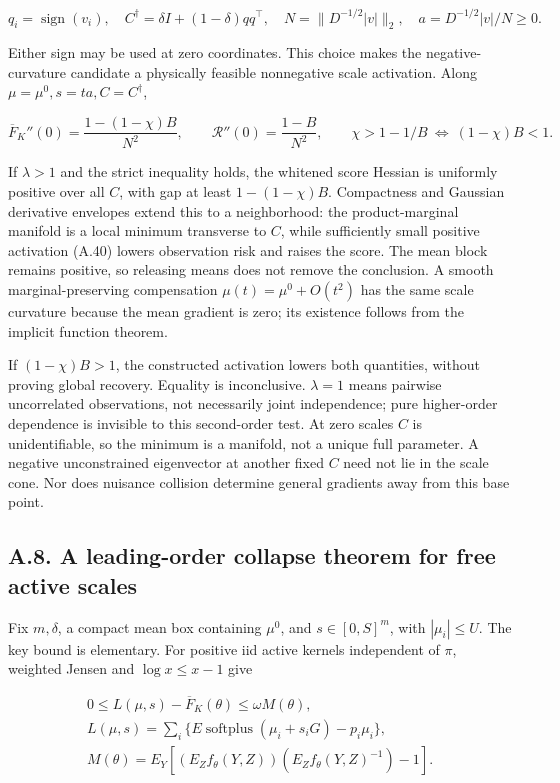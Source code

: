 \documentclass{article}
\begin{document}
\[
q_i=\operatorname{sign}(v_i),\quad
C^\dagger=\delta I+(1-\delta)qq^\top,\quad
N=\|D^{-1/2}|v|\|_2,\quad a=D^{-1/2}|v|/N\ge0.
\tag{A.40}
\]

Either sign may be used at zero coordinates. This choice makes the
negative-curvature candidate a physically feasible nonnegative scale
activation. Along \(\mu=\mu^0,s=ta,C=C^\dagger\),

\[
\overline F_K''(0)=\frac{1-(1-\chi)B}{N^2},\qquad
\mathcal R''(0)=\frac{1-B}{N^2},\qquad
\chi>1-1/B\ \Longleftrightarrow\ (1-\chi)B<1.
\tag{A.41}
\]

If \(\lambda>1\) and the strict inequality holds, the whitened score
Hessian is uniformly positive over all \(C\), with gap at least
\(1-(1-\chi)B\). Compactness and Gaussian derivative envelopes extend
this to a neighborhood: the product-marginal manifold is a local minimum
transverse to \(C\), while sufficiently small positive activation (A.40)
lowers observation risk and raises the score. The mean block remains
positive, so releasing means does not remove the conclusion. A smooth
marginal-preserving compensation \(\mu(t)=\mu^0+O(t^2)\) has the same
scale curvature because the mean gradient is zero; its existence follows
from the implicit function theorem.

If \((1-\chi)B>1\), the constructed activation lowers both quantities,
without proving global recovery. Equality is inconclusive. \(\lambda=1\)
means pairwise uncorrelated observations, not necessarily joint
independence; pure higher-order dependence is invisible to this
second-order test. At zero scales \(C\) is unidentifiable, so the
minimum is a manifold, not a unique full parameter. A negative
unconstrained eigenvector at another fixed \(C\) need not lie in the
scale cone. Nor does nuisance collision determine general gradients away
from this base point.

\subsection*{A.8. A leading-order collapse theorem for free active
scales}\label{a.8.-a-leading-order-collapse-theorem-for-free-active-scales}

Fix \(m,\delta\), a compact mean box containing \(\mu^0\), and
\(s\in[0,S]^m\), with \(|\mu_i|\le U\). The key bound is elementary. For
positive iid active kernels independent of \(\pi\), weighted Jensen and
\(\log x\le x-1\) give

\[
\begin{gathered}
0\le L(\mu,s)-\overline F_K(\theta)\le\omega M(\theta),\\
L(\mu,s)=\sum_i\{E\operatorname{softplus}(\mu_i+s_iG)-p_i\mu_i\},\\
M(\theta)=E_Y[(E_Zf_\theta(Y,Z))(E_Zf_\theta(Y,Z)^{-1})-1].
\end{gathered}
\tag{A.42}
\]
\end{document}
